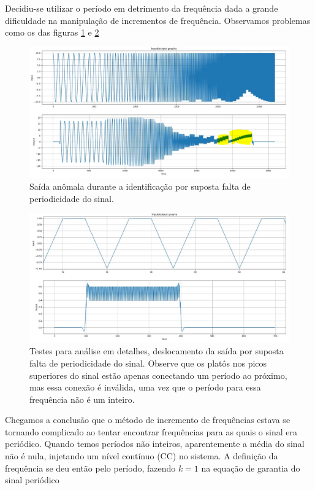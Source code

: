 \documentclass[x11names,a4paper,12pt]{article}
\begin{document}
Decidiu-se utilizar o período em detrimento da frequência dada a grande dificuldade na manipulação de incrementos de frequência. Observamos problemas como os das figuras \ref{fig:bias_freq_next_to_pi_sweep} e \ref{fig:bias_freq_next_to_pi}

\begin{figure}[H]
  \centering
  \includegraphics[scale=0.25]{figures/bias_freq_next_to_pi_sweep.PNG}
  \caption{Saída anômala durante a identificação por suposta falta de periodicidade do sinal.}\label{fig:bias_freq_next_to_pi_sweep}
\end{figure}

\begin{figure}[H]
  \centering
  \includegraphics[scale=0.25]{figures/bias_freq_next_to_pi.PNG}
  \caption{Testes para análise em detalhes, deslocamento da saída por suposta falta de periodicidade do sinal. Observe que os platôs nos picos superiores do sinal estão apenas conectando um período ao próximo, mas essa conexão é inválida, uma vez que o período para essa frequência não é um inteiro.}\label{fig:bias_freq_next_to_pi}
\end{figure}

Chegamos a conclusão que o método de incremento de frequências estava se tornando complicado ao tentar encontrar frequências para as quais o sinal era periódico. Quando temos períodos não inteiros, aparentemente a média do sinal não é nula, injetando um nível contínuo (CC) no sistema. A definição da frequência se deu então pelo período, fazendo $k=1$ na equação de garantia do sinal periódico
\end{document}
